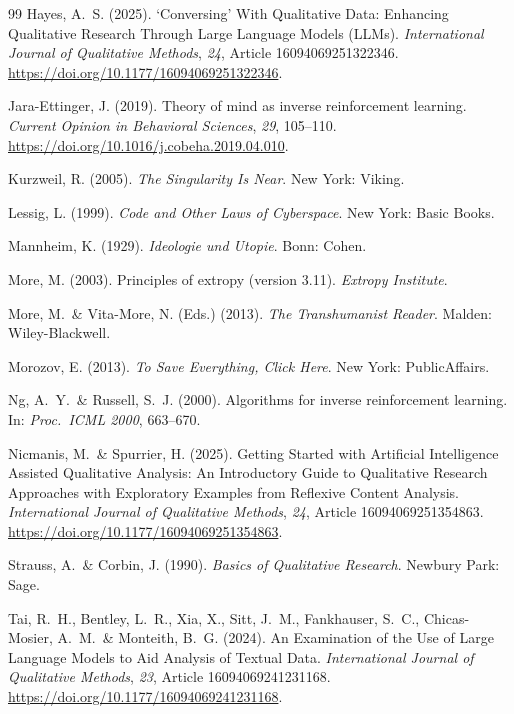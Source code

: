 \documentclass[12pt,a4paper]{article}
\begin{document}
\begin{thebibliography}{99}
  Hayes, A.~S. (2025).
  `Conversing' With Qualitative Data: Enhancing Qualitative Research Through Large Language Models (LLMs).
  \textit{International Journal of Qualitative Methods}, \textit{24}, Article 16094069251322346.
  \url{https://doi.org/10.1177/16094069251322346}.

  Jara-Ettinger, J. (2019).
  Theory of mind as inverse reinforcement learning.
  \textit{Current Opinion in Behavioral Sciences}, \textit{29}, 105--110.
  \url{https://doi.org/10.1016/j.cobeha.2019.04.010}.

  Kurzweil, R. (2005).
  \textit{The Singularity Is Near}.
  New York: Viking.

  Lessig, L. (1999).
  \textit{Code and Other Laws of Cyberspace}.
  New York: Basic Books.

  Mannheim, K. (1929).
  \textit{Ideologie und Utopie}.
  Bonn: Cohen.

  More, M. (2003).
  Principles of extropy (version 3.11).
  \textit{Extropy Institute}.

  More, M.~\& Vita-More, N. (Eds.) (2013).
  \textit{The Transhumanist Reader}.
  Malden: Wiley-Blackwell.

  Morozov, E. (2013).
  \textit{To Save Everything, Click Here}.
  New York: PublicAffairs.

  Ng, A.~Y.~\& Russell, S.~J. (2000).
  Algorithms for inverse reinforcement learning.
  In: \textit{Proc.\ ICML 2000}, 663--670.

  Nicmanis, M.~\& Spurrier, H. (2025).
  Getting Started with Artificial Intelligence Assisted Qualitative Analysis: An Introductory Guide to Qualitative Research Approaches with Exploratory Examples from Reflexive Content Analysis.
  \textit{International Journal of Qualitative Methods}, \textit{24}, Article 16094069251354863.
  \url{https://doi.org/10.1177/16094069251354863}.

  Strauss, A.~\& Corbin, J. (1990).
  \textit{Basics of Qualitative Research}.
  Newbury Park: Sage.

  Tai, R.~H., Bentley, L.~R., Xia, X., Sitt, J.~M., Fankhauser, S.~C., Chicas-Mosier, A.~M.~\& Monteith, B.~G. (2024).
  An Examination of the Use of Large Language Models to Aid Analysis of Textual Data.
  \textit{International Journal of Qualitative Methods}, \textit{23}, Article 16094069241231168.
  \url{https://doi.org/10.1177/16094069241231168}.


\end{thebibliography}
\end{document}
